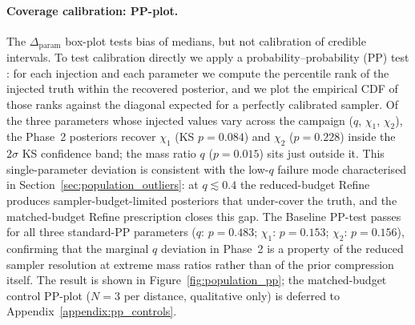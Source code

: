\documentclass[12pt]{article}
\begin{document}
\paragraph{Coverage calibration: PP-plot.}
The $\Delta_{\mathrm{param}}$ box-plot tests bias of medians, but not calibration of credible intervals. To test calibration directly we apply a probability--probability (PP) test \citep{Cook2006,Veitch2015}: for each injection and each parameter we compute the percentile rank of the injected truth within the recovered posterior, and we plot the empirical CDF of those ranks against the diagonal expected for a perfectly calibrated sampler. Of the three parameters whose injected values vary across the campaign ($q$, $\chi_1$, $\chi_2$), the Phase~2 posteriors recover $\chi_1$ (KS $p = 0.084$) and $\chi_2$ ($p = 0.228$) inside the $2\sigma$ KS confidence band; the mass ratio $q$ ($p = 0.015$) sits just outside it. This single-parameter deviation is consistent with the low-$q$ failure mode characterised in Section~\ref{sec:population_outliers}: at $q \lesssim 0.4$ the reduced-budget Refine produces sampler-budget-limited posteriors that under-cover the truth, and the matched-budget Refine prescription closes this gap. The Baseline PP-test passes for all three standard-PP parameters ($q$: $p = 0.483$; $\chi_1$: $p = 0.153$; $\chi_2$: $p = 0.156$), confirming that the marginal $q$ deviation in Phase~2 is a property of the reduced sampler resolution at extreme mass ratios rather than of the prior compression itself. The result is shown in Figure~\ref{fig:population_pp}; the matched-budget control PP-plot ($N=3$ per distance, qualitative only) is deferred to Appendix~\ref{appendix:pp_controls}.
\end{document}
